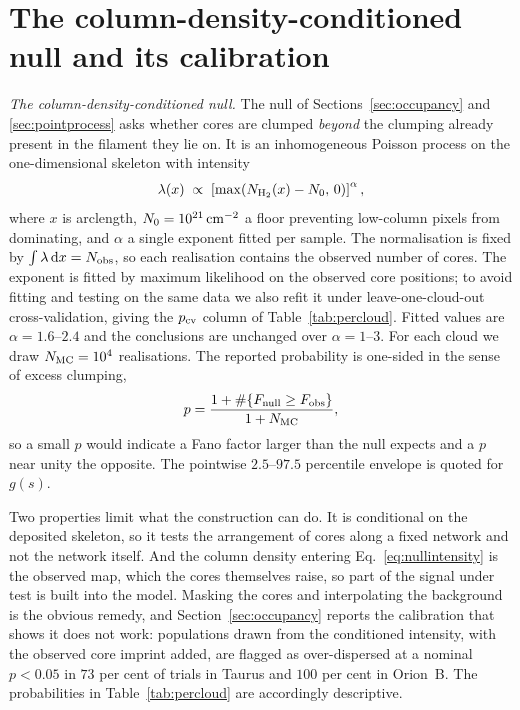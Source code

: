 \documentclass[usenatbib,twoside,twocolumn]{mnras}
\begin{document}
\section{The column-density-conditioned null and its calibration}
\label{sec:nullspec}

\emph{The column-density-conditioned null.} The null of Sections~\ref{sec:occupancy} and \ref{sec:pointprocess} asks whether cores are clumped \emph{beyond} the clumping already present in the filament they lie on. It is an inhomogeneous Poisson process on the one-dimensional skeleton with intensity
\begin{equation}
\lambda(x)\;\propto\;\left[\max\!\left(N_{\rm H_2}(x)-N_0,\,0\right)\right]^{\alpha},
\label{eq:nullintensity}
\end{equation}
where $x$ is arclength, $N_0=10^{21}\,{\rm cm^{-2}}$ a floor preventing low-column pixels from dominating, and $\alpha$ a single exponent fitted per sample. The normalisation is fixed by $\int\lambda\,{\rm d}x=N_{\rm obs}$, so each realisation contains the observed number of cores. The exponent is fitted by maximum likelihood on the observed core positions; to avoid fitting and testing on the same data we also refit it under leave-one-cloud-out cross-validation, giving the $p_{\rm cv}$ column of Table~\ref{tab:percloud}. Fitted values are $\alpha=1.6$--$2.4$ and the conclusions are unchanged over $\alpha=1$--$3$. For each cloud we draw $N_{\rm MC}=10^4$ realisations. The reported probability is one-sided in the sense of excess clumping,
\begin{equation}
p=\frac{1+\#\{F_{\rm null}\geq F_{\rm obs}\}}{1+N_{\rm MC}},
\label{eq:pval}
\end{equation}
so a small $p$ would indicate a Fano factor larger than the null expects and a $p$ near unity the opposite. The pointwise $2.5$--$97.5$ percentile envelope is quoted for $g(s)$.

Two properties limit what the construction can do. It is conditional on the deposited skeleton, so it tests the arrangement of cores along a fixed network and not the network itself. And the column density entering Eq.~\ref{eq:nullintensity} is the observed map, which the cores themselves raise, so part of the signal under test is built into the model. Masking the cores and interpolating the background is the obvious remedy, and Section~\ref{sec:occupancy} reports the calibration that shows it does not work: populations drawn from the conditioned intensity, with the observed core imprint added, are flagged as over-dispersed at a nominal $p<0.05$ in $73$ per cent of trials in Taurus and $100$ per cent in Orion~B. The probabilities in Table~\ref{tab:percloud} are accordingly descriptive.
\end{document}
